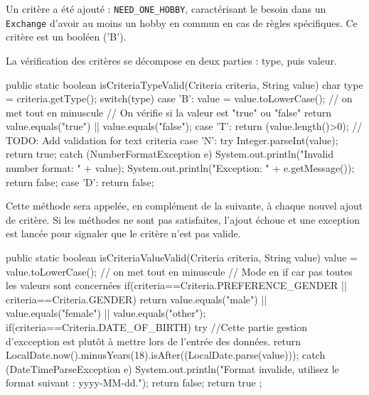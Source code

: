 \documentclass{mytex}
\begin{document}
Un critère a été ajouté : \texttt{NEED\_ONE\_HOBBY}, caractérisant le besoin dans un \texttt{Exchange} d'avoir au moins un hobby en commun en cas de règles spécifiques. Ce critère est un booléen ('B').

La vérification des critères se décompose en deux parties : type, puis valeur.


\begin{codebox}
public static boolean isCriteriaTypeValid(Criteria criteria, String value) {
	char type = criteria.getType();
	switch(type) {
		case 'B':
		value = value.toLowerCase(); // on met tout en minuscule
		// On vérifie si la valeur est "true" ou "false"
		return value.equals("true") || value.equals("false");
		case 'T':
		return (value.length()>0); // TODO: Add validation for text criteria
		case 'N':
		try {
			Integer.parseInt(value);
			return true;
		} catch (NumberFormatException e) {
			System.out.println("Invalid number format: " + value);
			System.out.println("Exception: " + e.getMessage());
			return false;
		}
		case 'D':
	}
	return false;
}
\end{codebox}

Cette méthode sera appelée, en complément de la suivante, à chaque nouvel ajout de critère. Si les méthodes ne sont pas satisfaites, l'ajout échoue et une exception est lancée pour signaler que le critère n'est pas valide.


\begin{codebox}
public static boolean isCriteriaValueValid(Criteria criteria, String value) {
	value = value.toLowerCase(); // on met tout en minuscule
	// Mode en if car pas toutes les valeurs sont concernées
	if(criteria==Criteria.PREFERENCE_GENDER || criteria==Criteria.GENDER) return value.equals("male") || value.equals("female") || value.equals("other");
	if(criteria==Criteria.DATE_OF_BIRTH) {
		try {   //Cette partie gestion d'excception est plutôt à mettre lors de l'entrée des données.
			return LocalDate.now().minusYears(18).isAfter((LocalDate.parse(value)));
		} catch (DateTimeParseException e) {
			System.out.println("Format invalide, utilisez le format suivant : yyyy-MM-dd."); 
			return false;
		}
	}   
	return true ;
}
\end{codebox}

\end{document}
